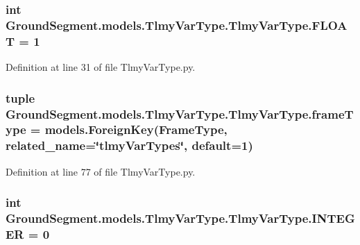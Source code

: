 \subsubsection[{F\+L\+O\+A\+T}]{\setlength{\rightskip}{0pt plus 5cm}int Ground\+Segment.\+models.\+Tlmy\+Var\+Type.\+Tlmy\+Var\+Type.\+F\+L\+O\+A\+T = 1\hspace{0.3cm}{\ttfamily [static]}}\label{class_ground_segment_1_1models_1_1_tlmy_var_type_1_1_tlmy_var_type_afdb00719ba2166de0c0a88c99831ce17}


Definition at line 31 of file Tlmy\+Var\+Type.\+py.

\hypertarget{class_ground_segment_1_1models_1_1_tlmy_var_type_1_1_tlmy_var_type_aa4241db1149485f318d75580acc3c805}{}
\subsubsection[{frame\+Type}]{\setlength{\rightskip}{0pt plus 5cm}tuple Ground\+Segment.\+models.\+Tlmy\+Var\+Type.\+Tlmy\+Var\+Type.\+frame\+Type = models.\+Foreign\+Key({\bf Frame\+Type}, related\+\_\+name=\char`\"{}tlmy\+Var\+Types\char`\"{}, default=1)\hspace{0.3cm}{\ttfamily [static]}}\label{class_ground_segment_1_1models_1_1_tlmy_var_type_1_1_tlmy_var_type_aa4241db1149485f318d75580acc3c805}


Definition at line 77 of file Tlmy\+Var\+Type.\+py.

\hypertarget{class_ground_segment_1_1models_1_1_tlmy_var_type_1_1_tlmy_var_type_adc451c520401bd045ade72bc72a430af}{}
\subsubsection[{I\+N\+T\+E\+G\+E\+R}]{\setlength{\rightskip}{0pt plus 5cm}int Ground\+Segment.\+models.\+Tlmy\+Var\+Type.\+Tlmy\+Var\+Type.\+I\+N\+T\+E\+G\+E\+R = 0\hspace{0.3cm}{\ttfamily [static]}}\label{class_ground_segment_1_1models_1_1_tlmy_var_type_1_1_tlmy_var_type_adc451c520401bd045ade72bc72a430af}


